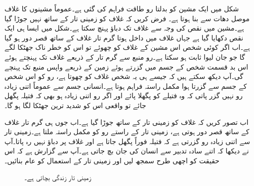 شکل میں ایک مشین کو بدلتا رو طاقت فراہم کی گئی ہے۔عموماً مشینوں کا غلاف موصل دھات سے بنا ہوتا ہے۔ فرض کریں کہ غلاف کو زمینی تار کے ساتھ نہیں جوڑا گیا ہے۔مشین میں نقص کی وجہ سے غلاف تک دباؤ پہنچ سکتا ہے۔شکل میں ایسا ہی ایک نقص دکھایا گیا ہے جہاں غلاف میں داخل ہوتا گرم تار غلاف کے ساتھ قصر دور ہو گیا ہے۔اب اگر کوئی شخص اس مشین کے غلاف کو چھوئے تو اس کو خطر ناک جھٹکا لگے گا جو جان لیوا ثابت ہو سکتا ہے۔رو منبع سے گرم تار کے ذریعے غلاف تک پہنچتے ہوئے اس بد قسمت شخص کے جسم میں گزرتے ہوئے زمین کے ذریعے واپس منبع تک پہنچے گی۔آپ دیکھ سکتے ہیں کہ جیسے ہی یہ شخص غلاف کو چھوتا ہے، رو کو اس شخص کے جسم سے گزرتا ہوا مکمل راستہ فراہم ہوتا ہے۔انسانی جسم سے عموماً اتنی زیادہ رو نہیں گزر پاتی کہ وہ فتیلے کو پگھلا پائے اور اگر رو اتنی زیادہ ہو بھی کہ فتیلہ پگھل جائے تو واقعی اس کو شدید ترین جھٹکا لگا ہو گا۔

اب تصور کریں کہ غلاف کو زمینی تار کے ساتھ جوڑا گیا ہے۔اب جوں ہی گرم تار غلاف کے ساتھ قصر دور ہوتی ہے، زمینی تار کے راستے رو کو مکمل راستہ ملتا ہے۔زمینی تار  سے اتنی زیادہ رو گزرتی ہے کہ فتیلہ فوراً پگھل جاتا ہے اور غلاف پر دباؤ نہیں رہ پاتا۔آپ نے دیکھا کہ اتنے سادہ تدبیر سے انسان کی جان بچ جاتی ہے۔آپ سے گزارش ہے کہ اس حقیقت کو اچھی طرح سمجھ لیں اور زمینی تار کے استعمال کو عام بنائیں۔ 

\begin{figure}
\centering
{}
\caption{زمینی تار زندگی بچاتی ہے۔}
\label{شکل_طاقت_زمینی_تار_حفاظتی_اقدام}
\end{figure}

